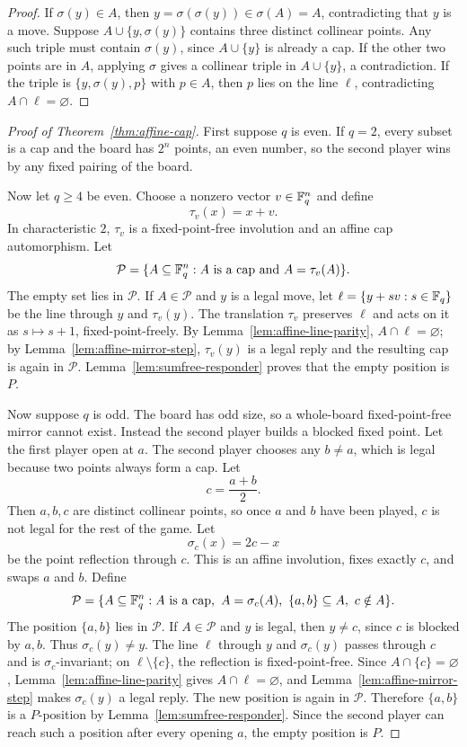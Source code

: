 \begin{proof}
If $\sigma(y)\in A$, then $y=\sigma(\sigma(y))\in \sigma(A)=A$, contradicting that $y$
is a move. Suppose $A\cup\{y,\sigma(y)\}$ contains three distinct collinear points. Any
such triple must contain $\sigma(y)$, since $A\cup\{y\}$ is already a cap. If the other
two points are in $A$, applying $\sigma$ gives a collinear triple in $A\cup\{y\}$, a
contradiction. If the triple is $\{y,\sigma(y),p\}$ with $p\in A$, then $p$ lies on
the line $\ell$, contradicting $A\cap\ell=\varnothing$.
\end{proof}

\begin{proof}[Proof of Theorem~\ref{thm:affine-cap}]
First suppose $q$ is even. If $q=2$, every subset is a cap and the board has $2^n$ points,
an even number, so the second player wins by any fixed pairing of the board.

Now let $q\geq 4$ be even. Choose a nonzero vector $v\in\mathbb{F}_q^n$ and define
\[
  \tau_v(x)=x+v.
\]
In characteristic $2$, $\tau_v$ is a fixed-point-free involution and an affine cap
automorphism. Let
\[
  \mathcal P=\{A\subseteq\mathbb{F}_q^n: A\text{ is a cap and }A=\tau_v(A)\}.
\]
The empty set lies in $\mathcal P$. If $A\in\mathcal P$ and $y$ is a legal move, let
$\ell=\{y+sv:s\in\mathbb{F}_q\}$ be the line through $y$ and $\tau_v(y)$. The translation
$\tau_v$ preserves $\ell$ and acts on it as $s\mapsto s+1$, fixed-point-freely. By
Lemma~\ref{lem:affine-line-parity}, $A\cap\ell=\varnothing$; by
Lemma~\ref{lem:affine-mirror-step}, $\tau_v(y)$ is a legal reply and the resulting cap
is again in $\mathcal P$. Lemma~\ref{lem:sumfree-responder} proves that the empty
position is $P$.

Now suppose $q$ is odd. The board has odd size, so a whole-board fixed-point-free mirror
cannot exist. Instead the second player builds a blocked fixed point. Let the first
player open at $a$. The second player chooses any $b\neq a$, which is legal because two
points always form a cap. Let
\[
  c=\frac{a+b}{2}.
\]
Then $a,b,c$ are distinct collinear points, so once $a$ and $b$ have been played, $c$ is
not legal for the rest of the game. Let
\[
  \sigma_c(x)=2c-x
\]
be the point reflection through $c$. This is an affine involution, fixes exactly $c$, and
swaps $a$ and $b$. Define
\[
  \mathcal P=\{A\subseteq\mathbb{F}_q^n: A\text{ is a cap},\ A=\sigma_c(A),\ \{a,b\}\subseteq A,
    \ c\notin A\}.
\]
The position $\{a,b\}$ lies in $\mathcal P$. If $A\in\mathcal P$ and $y$ is legal, then
$y\neq c$, since $c$ is blocked by $a,b$. Thus $\sigma_c(y)\neq y$. The line $\ell$
through $y$ and $\sigma_c(y)$ passes through $c$ and is $\sigma_c$-invariant; on
$\ell\setminus\{c\}$, the reflection is fixed-point-free. Since $A\cap\{c\}=\varnothing$,
Lemma~\ref{lem:affine-line-parity} gives $A\cap\ell=\varnothing$, and
Lemma~\ref{lem:affine-mirror-step} makes $\sigma_c(y)$ a legal reply. The new position
is again in $\mathcal P$. Therefore $\{a,b\}$ is a $P$-position by
Lemma~\ref{lem:sumfree-responder}. Since the second player can reach such a position
after every opening $a$, the empty position is $P$.
\end{proof}

